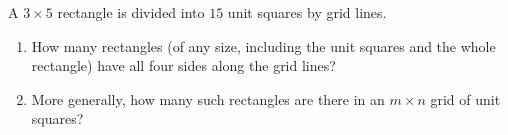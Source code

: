 A $3\times5$ rectangle is divided into $15$ unit squares by grid lines.
\begin{enumerate}
\item[(a)] How many rectangles (of any size, including the unit squares and the whole rectangle) have all four sides along the grid lines?
\item[(b)] More generally, how many such rectangles are there in an $m\times n$ grid of unit squares?
\end{enumerate}
